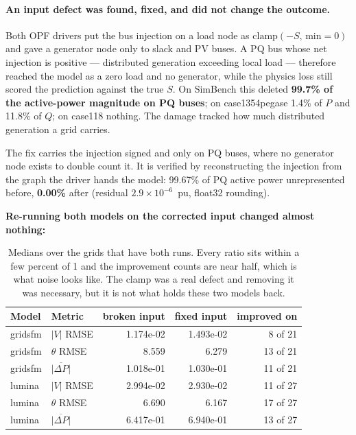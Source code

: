 \documentclass[10pt]{article}
\begin{document}
\paragraph{An input defect was found, fixed, and did not change the outcome.}
Both OPF drivers put the bus injection on a load node as
$\mathrm{clamp}(-S,\,\mathrm{min}=0)$ and gave a generator node only to slack
and PV buses. A PQ bus whose net injection is positive --- distributed
generation exceeding local load --- therefore reached the model as a zero load
and no generator, while the physics loss still scored the prediction against the
true $S$. On SimBench this deleted \textbf{99.7\% of the active-power magnitude
on PQ buses}; on case1354pegase 1.4\% of $P$ and 11.8\% of $Q$; on case118
nothing. The damage tracked how much distributed generation a grid carries.

The fix carries the injection signed and only on PQ buses, where no generator
node exists to double count it. It is verified by reconstructing the injection
from the graph the driver hands the model: 99.67\% of PQ active power
unrepresented before, \textbf{0.00\%} after (residual $2.9\times10^{-6}$~pu,
float32 rounding).

\textbf{Re-running both models on the corrected input changed almost nothing:}

\begin{table}[H]
\centering\small
\begin{tabular}{llrrr}
\toprule
Model & Metric & broken input & fixed input & improved on \\
\midrule
gridsfm & $|V|$ RMSE & 1.174e-02 & 1.493e-02 & 8 of 21 \\
gridsfm & $\theta$ RMSE & 8.559 & 6.279 & 13 of 21 \\
gridsfm & $\overline{|\Delta P|}$ & 1.018e-01 & 1.030e-01 & 11 of 21 \\
lumina  & $|V|$ RMSE & 2.994e-02 & 2.930e-02 & 11 of 27 \\
lumina  & $\theta$ RMSE & 6.690 & 6.167 & 17 of 27 \\
lumina  & $\overline{|\Delta P|}$ & 6.417e-01 & 6.940e-01 & 13 of 27 \\
\bottomrule
\end{tabular}
\caption{Medians over the grids that have both runs. Every ratio sits within a
few percent of 1 and the improvement counts are near half, which is what noise
looks like. The clamp was a real defect and removing it was necessary, but it is
not what holds these two models back.}
\end{table}
\end{document}
